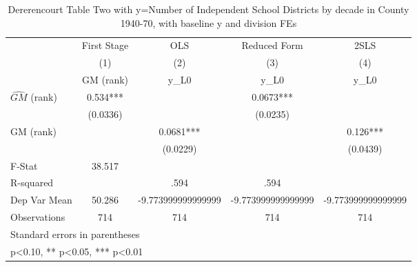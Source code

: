 \begin{table}[htbp]\centering
\def\sym#1{\ifmmode^{#1}\else\(^{#1}\)\fi}
\caption{Dererencourt Table Two with y=Number of Independent School Districts by decade in County 1940-70, with baseline y and division FEs}
\begin{tabular}{l*{4}{c}}
\toprule
                    & First Stage   &         OLS   &Reduced Form   &        2SLS   \\
                    &\multicolumn{1}{c}{(1)}&\multicolumn{1}{c}{(2)}&\multicolumn{1}{c}{(3)}&\multicolumn{1}{c}{(4)}\\
                    &\multicolumn{1}{c}{GM  (rank)}&\multicolumn{1}{c}{y\_L0}&\multicolumn{1}{c}{y\_L0}&\multicolumn{1}{c}{y\_L0}\\
\midrule
$\hat{GM}$ (rank)   &       0.534***&               &      0.0673***&               \\
                    &    (0.0336)   &               &    (0.0235)   &               \\
\addlinespace
GM  (rank)          &               &      0.0681***&               &       0.126***\\
                    &               &    (0.0229)   &               &    (0.0439)   \\
\midrule
F-Stat              &      38.517   &               &               &               \\
R-squared           &               &        .594   &        .594   &               \\
Dep Var Mean        &      50.286   &-9.773999999999999   &-9.773999999999999   &-9.773999999999999   \\
Observations        &         714   &         714   &         714   &         714   \\
\bottomrule
\multicolumn{5}{l}{\footnotesize Standard errors in parentheses}\\
\multicolumn{5}{l}{\footnotesize * p<0.10, ** p<0.05, *** p<0.01}\\
\end{tabular}
\end{table}
